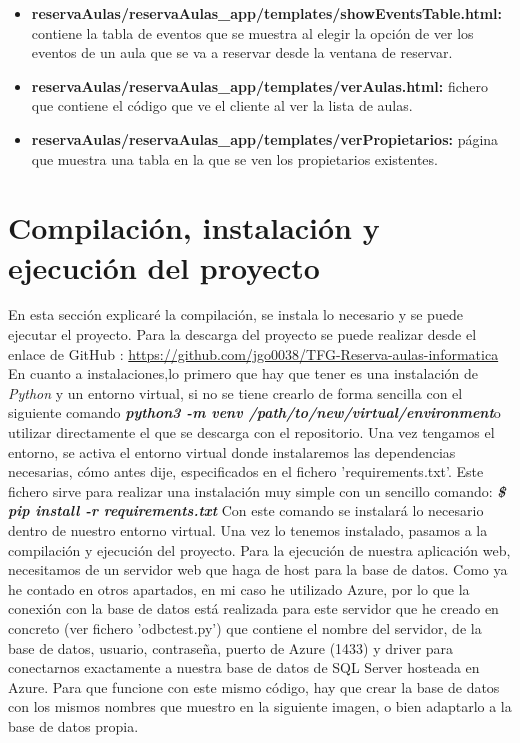 \begin{itemize}
    \item \textbf{reservaAulas/reservaAulas\_app/templates/showEventsTable.html:} contiene la tabla de eventos que se muestra al elegir la opción de ver los eventos de un aula que se va a reservar desde la ventana de reservar.
    \item \textbf{reservaAulas/reservaAulas\_app/templates/verAulas.html:} fichero que contiene el código que ve el cliente al ver la lista de aulas.
    \item \textbf{reservaAulas/reservaAulas\_app/templates/verPropietarios:} página que muestra una tabla en la que se ven los propietarios existentes.
\end{itemize}


\section{Compilación, instalación y ejecución del proyecto}
En esta sección explicaré la compilación, se instala lo necesario y se puede ejecutar el proyecto.\newline
Para la descarga del proyecto se puede realizar desde el enlace de GitHub :\newline
\url{https://github.com/jgo0038/TFG-Reserva-aulas-informatica}\newline
En cuanto a instalaciones,lo primero que hay que tener es una instalación de \textit{Python} y un entorno virtual, si no se tiene crearlo de forma sencilla con el siguiente comando\newline
\textbf{\textit{python3 -m venv /path/to/new/virtual/environment}}\newline o utilizar directamente el que se descarga con el repositorio.
\newline
 Una vez tengamos el entorno, se activa el entorno virtual donde instalaremos las dependencias necesarias, cómo antes dije, especificados en el fichero 'requirements.txt'. Este fichero sirve para realizar una instalación muy simple con un sencillo comando: \newline
 \textbf{\textit{\$ pip install -r requirements.txt }} \newline
Con este comando se instalará lo necesario dentro de nuestro entorno virtual. Una vez lo tenemos instalado, pasamos a la compilación y ejecución del proyecto. \newline
Para la ejecución de nuestra aplicación web, necesitamos de un servidor web que haga de host para la base de datos. Como ya he contado en otros apartados, en mi caso he utilizado Azure, por lo que la conexión con la base de datos está realizada para este servidor que he creado en concreto (ver fichero 'odbctest.py') que contiene el nombre del servidor, de la base de datos, usuario, contraseña, puerto de Azure (1433) y driver para conectarnos exactamente a nuestra base de datos de SQL Server hosteada en Azure. Para que funcione con este mismo código, hay que crear la base de datos con los mismos nombres que muestro en la siguiente imagen, o bien adaptarlo a la base de datos propia.\newline
